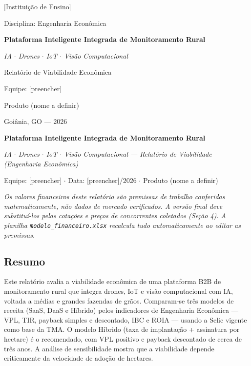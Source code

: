 \documentclass[12pt,a4paper]{article}
\begin{document}
\begin{titlepage}
\centering
\vspace*{1cm}
{\color{grey}\large [Instituição de Ensino]\par}
\vspace{0.3cm}
{\color{grey}\large Disciplina: Engenharia Econômica\par}
\vfill
{\bfseries\Huge Plataforma Inteligente Integrada de Monitoramento Rural\par}
\vspace{0.6cm}
{\color{accent}\Large\itshape IA $\cdot$ Drones $\cdot$ IoT $\cdot$ Visão Computacional\par}
\vspace{0.4cm}
{\large Relatório de Viabilidade Econômica\par}
\vfill
{\large Equipe: [preencher]\par}
\vspace{0.2cm}
{\color{grey}\large Produto (nome a definir)\par}
\vfill
{\large Goiânia, GO --- 2026\par}
\end{titlepage}

{\bfseries\LARGE Plataforma Inteligente Integrada de Monitoramento Rural\par}
\vspace{2pt}
{\color{grey}\itshape IA $\cdot$ Drones $\cdot$ IoT $\cdot$ Visão Computacional --- Relatório de Viabilidade (Engenharia Econômica)\par}
\vspace{2pt}
{\color{grey}\small Equipe: [preencher] $\cdot$ Data: [preencher]/2026 $\cdot$ Produto (nome a definir)\par}

\vspace{6pt}
\noindent\colorbox{accent!8}{\parbox{\dimexpr\textwidth-2\fboxsep}{\small\itshape Os valores financeiros deste relatório são premissas de trabalho conferidas matematicamente, não dados de mercado verificados. A versão final deve substituí-los pelas cotações e preços de concorrentes coletados (Seção 4). A planilha \texttt{modelo\_financeiro.xlsx} recalcula tudo automaticamente ao editar as premissas.}}

\subsection*{Resumo}
Este relatório avalia a viabilidade econômica de uma plataforma B2B de monitoramento rural que integra drones, IoT e visão computacional com IA, voltada a médias e grandes fazendas de grãos. Comparam-se três modelos de receita (SaaS, DaaS e Híbrido) pelos indicadores de Engenharia Econômica --- VPL, TIR, payback simples e descontado, IBC e ROIA --- usando a Selic vigente como base da TMA. O modelo Híbrido (taxa de implantação + assinatura por hectare) é o recomendado, com VPL positivo e payback descontado de cerca de três anos. A análise de sensibilidade mostra que a viabilidade depende criticamente da velocidade de adoção de hectares.
\end{document}
